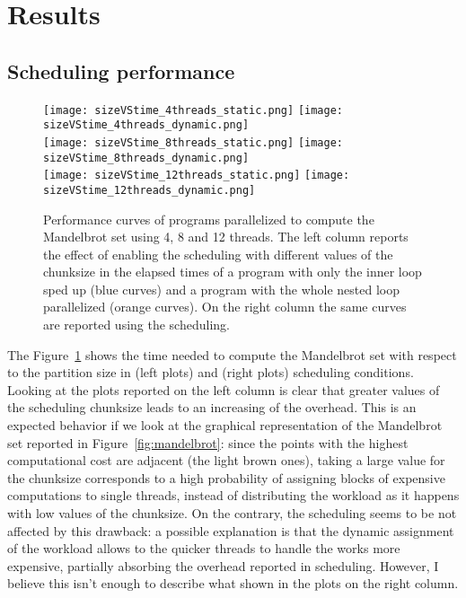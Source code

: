 \section{Results}\label{sec:result}

\subsection{Scheduling performance}\label{sec:res-sched}

\begin{figure}[p!]
    \centering
    \null\hfill
    \texttt{[image: sizeVStime\_4threads\_static.png]}
    \null\hfill
    \texttt{[image: sizeVStime\_4threads\_dynamic.png]}
    \null\hfill
    \\
    \null\hfill
    \texttt{[image: sizeVStime\_8threads\_static.png]}
    \null\hfill
    \texttt{[image: sizeVStime\_8threads\_dynamic.png]}
    \null\hfill
    \\
    \null\hfill
    \texttt{[image: sizeVStime\_12threads\_static.png]}
    \null\hfill
    \texttt{[image: sizeVStime\_12threads\_dynamic.png]}
    \null\hfill
    \caption{\label{fig:sched}
    Performance curves of programs parallelized to compute the Mandelbrot set using 4, 8 and 12 threads. The left column reports the effect of enabling the  scheduling with different values of the chunksize in the elapsed times of a program with only the inner loop sped up (blue curves) and a program with the whole nested loop parallelized (orange curves). On the right column the same curves are reported using the  scheduling.}
\end{figure}

The Figure~\ref{fig:sched} shows the time needed to compute the Mandelbrot set with respect to the partition size in  (left plots) and  (right plots) scheduling conditions. Looking at the plots reported on the left column is clear that greater values of the scheduling chunksize leads to an increasing of the overhead. This is an expected behavior if we look at the graphical representation of the Mandelbrot set reported in Figure~\ref{fig:mandelbrot}: since the points with the highest computational cost are adjacent (the light brown ones), taking a large value for the chunksize corresponds to a high probability of assigning blocks of expensive computations to single threads, instead of distributing the workload as it happens with low values of the chunksize. On the contrary, the  scheduling seems to be not affected by this drawback: a possible explanation is that the dynamic assignment of the workload allows to the quicker threads to handle the works more expensive, partially absorbing the overhead reported in  scheduling. However, I believe this isn't enough to describe what shown in the plots on the right column.

